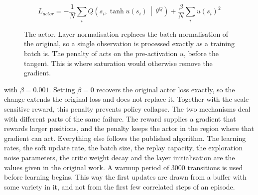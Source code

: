 \begin{equation}
L_{actor} = -\frac{1}{N}\sum_{i} Q\!\left(s_i, \tanh u(s_i) \,\middle|\, \theta^{Q}\right) + \frac{\beta}{N}\sum_{i} u(s_i)^2
\label{Equation:ActorRegularisation}
\end{equation}

\begin{figure}[htb!]
\centering
{}
\caption{The actor. Layer normalisation replaces the batch normalisation of the original, so a single observation is processed exactly as a training batch is. The penalty of  acts on the pre-activation $u$, before the tangent. This is where saturation would otherwise remove the gradient.}
\label{Figure:ActorNetwork}
\end{figure}

with $\beta = 0.001$. Setting $\beta = 0$ recovers the original actor loss exactly, so the change extends the original loss and does not replace it. Together with the scale-sensitive reward, this penalty prevents policy collapse. The two mechanisms deal with different parts of the same failure. The reward supplies a gradient that rewards larger positions, and the penalty keeps the actor in the region where that gradient can act. Everything else follows the published algorithm. The learning rates, the soft update rate, the batch size, the replay capacity, the exploration noise parameters, the critic weight decay and the layer initialisation are the values given in the original work. A warmup period of $3000$ transitions is used before learning begins. This way the first updates are drawn from a buffer with some variety in it, and not from the first few correlated steps of an episode.